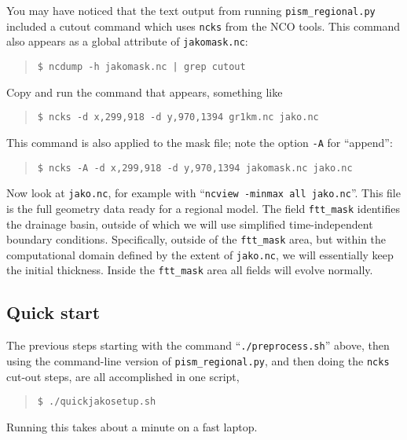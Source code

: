 You may have noticed that the text output from running \texttt{pism_regional.py} included a cutout command which uses \texttt{ncks} from the NCO tools.  This command also appears as a global attribute of \texttt{jakomask.nc}:
\begin{quote}\small
\begin{verbatim}
$ ncdump -h jakomask.nc | grep cutout
\end{verbatim}
\normalsize\end{quote}
Copy and run the command that appears, something like
\begin{quote}\small
\begin{verbatim}
$ ncks -d x,299,918 -d y,970,1394 gr1km.nc jako.nc
\end{verbatim}
\normalsize\end{quote}
This command is also applied to the mask file; note the option \verb|-A| for ``append'':
\begin{quote}\small
\begin{verbatim}
$ ncks -A -d x,299,918 -d y,970,1394 jakomask.nc jako.nc
\end{verbatim}
\normalsize\end{quote}
Now look at \verb|jako.nc|, for example with ``\verb|ncview -minmax all jako.nc|''.  This file is the full geometry data ready for a regional model.  The field \verb|ftt_mask| identifies the drainage basin, outside of which we will use simplified time-independent boundary conditions.  Specifically, outside of the \verb|ftt_mask| area, but within the computational domain defined by the extent of \verb|jako.nc|, we will essentially keep the initial thickness.  Inside the \verb|ftt_mask| area all fields will evolve normally.

\subsection*{Quick start}
The previous steps starting with the command ``\verb|./preprocess.sh|'' above, then using the command-line version of \verb|pism_regional.py|, and then doing the \verb|ncks| cut-out steps, are all accomplished in one script,
\begin{quote}\small
\begin{verbatim}
$ ./quickjakosetup.sh
\end{verbatim}
\normalsize\end{quote}
Running this takes about a minute on a fast laptop.

